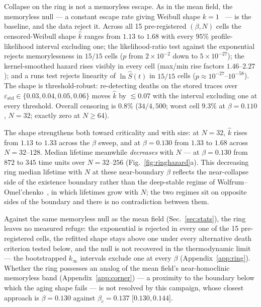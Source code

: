 \documentclass[pdflatex,sn-mathphys,Numbered]{sn-jnl}
\begin{document}
Collapse on the ring is not a memoryless escape. As in the mean field, the memoryless null --- a constant escape rate giving Weibull shape $k = 1$~\cite{wo2011} --- is the baseline, and the data reject it. Across all 15 pre-registered
$(\beta, N)$ cells the censored-Weibull shape $\hat k$ ranges from $1.13$ to
$1.68$ with every $95\%$ profile-likelihood interval excluding one; the
likelihood-ratio test against the exponential rejects memorylessness in $15/15$
cells ($p$ from $2\times10^{-2}$ down to $5\times10^{-27}$); the kernel-smoothed
hazard rises visibly in every cell (max/min rise factors $1.46$--$2.27$); and a
runs test rejects linearity of $\ln \hat S(t)$ in $15/15$ cells
($p \approx 10^{-27}$--$10^{-58}$). The shape is threshold-robust:
re-detecting deaths on the stored traces over
$\varepsilon_{\mathrm{std}} \in \{0.03, 0.04, 0.05, 0.06\}$ moves $\hat k$ by
$\lesssim 0.07$ with the interval excluding one at every threshold. Overall
censoring is $0.8\%$ ($34/4{,}500$; worst cell $9.3\%$ at $\beta = 0.110$,
$N = 32$; exactly zero at $N \ge 64$).

The shape strengthens both toward criticality and with size: at $N = 32$,
$\hat k$ rises from $1.13$ to $1.33$ across the $\beta$ sweep, and at
$\beta = 0.130$ from $1.33$ to $1.68$ across $N = 32$--$128$. Median lifetime
meanwhile \emph{decreases} with $N$ --- at $\beta = 0.130$ from $872$ to $345$
time units over $N = 32$--$256$ (Fig.~\ref{fig:ringhazard}a). This decreasing
ring median lifetime with $N$ at these near-boundary $\beta$ reflects the
near-collapse side of the existence boundary rather than the deep-stable regime
of Wolfrum--Omel'chenko~\cite{wo2011}, in which lifetimes grow with $N$; the two
regimes sit on opposite sides of the boundary and there is no contradiction
between them.

Against the same memoryless null as the mean field
(Sec.~\ref{sec:stats}), the ring leaves no measured refuge: the exponential is
rejected in every one of the 15 pre-registered cells, the refitted shape stays
above one under every alternative death criterion tested below, and the null is
not recovered in the thermodynamic limit --- the bootstrapped $k_\infty$
intervals exclude one at every $\beta$ (Appendix~\ref{app:ring}). Whether the
ring possesses an analog of the mean field's near-homoclinic memoryless band
(Appendix~\ref{app:corner}) --- a proximity to the boundary below which the
aging shape fails --- is not resolved by this campaign, whose closest approach
is $\beta = 0.130$ against $\beta_c = 0.137$ [$0.130, 0.144$].
\end{document}
